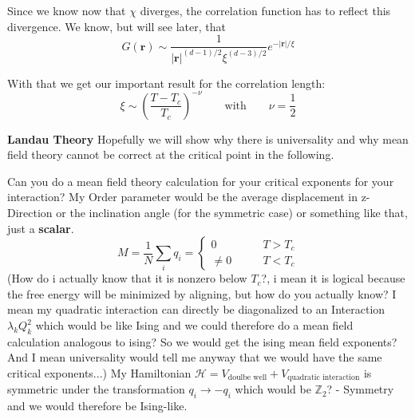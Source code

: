 	Since we know now that $\chi$ diverges, the correlation function has to reflect this divergence. We know, but will see later, that
	\begin{equation}
		G(\mathbf{r}) \sim \frac{1}{|\mathbf{r}|^{(d-1) / 2} \xi^{(d-3) / 2}} e^{- |\mathbf{r}| /	\xi}
	\end{equation}
	
	With that we get our important result for the correlation length:
	\begin{equation}
		\xi \sim \left(\frac{T- T_c}{T_c}\right)^{-\nu} \qquad \text{with} \qquad \nu =	\frac{1}{2}
	\end{equation}
	
	\textbf{Landau Theory}
	Hopefully we will show why there is universality and why mean field theory cannot be correct at the critical point in the following.
	
	Can you do a mean field theory calculation for your critical exponents for your	interaction? My Order parameter would be the average displacement in z-Direction or the inclination angle (for the symmetric case) or something like that, just a \textbf{scalar}.
	\begin{equation}
		M =	\frac{1}{N} \sum_i q_i =	\begin{cases}
			0 		\qquad &T > T_c \\
			\neq 0 \qquad &T < T_c
		\end{cases}
	\end{equation}
	(How do i actually know that it is nonzero below $T_c$?, i mean it is logical because the free energy will be minimized by aligning, but how do you actually know? I mean my quadratic interaction can directly be diagonalized to an Interaction $\lambda_k Q_k^2$ which would be like Ising and we could therefore do a mean field calculation analogous to ising? So we would get the ising mean field exponents? And I	mean universality would tell me anyway that we would have the same critical exponents...)
	My Hamiltonian $\mathcal{H} = V_{\text{doulbe well}} + V_{\text{quadratic interaction}}$ is symmetric under the transformation $q_i \rightarrow -q_i$ which would be $\mathbb{Z}_2$? -	Symmetry and we would therefore be Ising-like.
	
